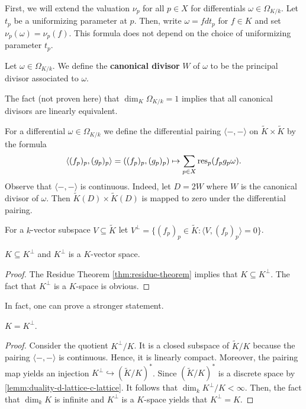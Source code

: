 First, we will extend the valuation $\nu_{p}$ for all $p\in X$ for differentials $\omega\in \Omega_{K/k}$. Let $t_{p}$ be a uniformizing parameter at $p$. Then, write $\omega = f dt_{p}$ for $f\in K$ and set $\nu_{p}(\omega) = \nu_{p}(f)$. This formula does not depend on the choice of uniformizing parameter $t_{p}$.
\begin{definition}\label{def:canonical-divisor}
	Let $\omega\in \Omega_{K/k}$. We define the \textbf{canonical divisor} $W$ of $\omega$ to be the principal divisor associated to $\omega$. 
\end{definition}
\begin{remark}\label{rem:canonical-divisor-are-all-linearly-equivalent}
	The fact (not proven here) that $\dim_{K}\Omega_{K/k} = 1$ implies that all canonical divisors are linearly equivalent.
\end{remark}
\begin{definition}\label{def:differential-pairing}
	For a differential $\omega\in \Omega_{K/k}$ we define the differential pairing $\langle -, -\rangle$ on $\widetilde{K} \times \widetilde{K}$ by the formula
	\[{}
		\langle (f_{p})_{p}, (g_{p})_{p}\rangle =  ((f_{p})_{p}, (g_{p})_{p})\mapsto \sum_{p\in X}	\operatorname{res}_{p}(f_{p}g_{p}\omega).
	\]
	Observe that $\langle -,-\rangle$ is continuous. Indeed, let $D = 2W$ where $W$ is the canonical divisor of $\omega$. Then $\widetilde{K}(D) \times \widetilde{K}(D)$ is mapped to zero under the differential pairing.	 
\end{definition}
For a $k$-vector subspace $V \subseteq \widetilde{K}$ let $V^{\perp} = \{(f_{p})_{p} \in \widetilde{K}\colon \langle V, (f_{p})_{p}\rangle = 0\}$.
\begin{lemma}\label{lemm:complement-of-K}
	$K \subseteq K^{\perp}$ and $K^{\perp}$ is a $K$-vector space. 
\end{lemma}
\begin{proof}
	The Residue Theorem \cref{thm:residue-theorem} implies that $K \subseteq K^{\perp}$. The fact that $K^{\perp}$ is a $K$-space is obvious.
\end{proof}
In fact, one can prove a stronger statement.
\begin{lemma}\label{lemm:K-equals-its-complement}
	$K = K^{\perp}$.
\end{lemma}
\begin{proof}
	Consider the quotient $K^{\perp}/K$. It is a closed subspace of $\widetilde{K}/K$ because the pairing $\langle -,-\rangle$ is continuous. Hence, it is linearly compact. Moreover, the pairing map yields an injection $K^{\perp} \hookrightarrow (\widetilde{K}/K)^{*}$. Since $(\widetilde{K}/K)^{*}$ is a discrete space by \cref{lemm:duality-d-lattice-c-lattice}. It follows that $\dim_{k}K^{\perp}/K < \infty$. Then, the fact that $\dim_{k} K$ is infinite and $K^{\perp}$ is a $K$-space yields that $K^{\perp} = K$.
\end{proof}
